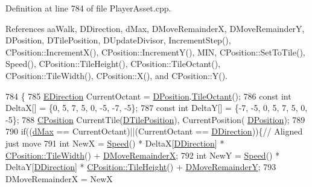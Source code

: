 Definition at line 784 of file Player\+Asset.\+cpp.



References aa\+Walk, D\+Direction, d\+Max, D\+Move\+RemainderX, D\+Move\+RemainderY, D\+Position, D\+Tile\+Position, D\+Update\+Divisor, Increment\+Step(), C\+Position\+::\+Increment\+X(), C\+Position\+::\+Increment\+Y(), M\+IN, C\+Position\+::\+Set\+To\+Tile(), Speed(), C\+Position\+::\+Tile\+Height(), C\+Position\+::\+Tile\+Octant(), C\+Position\+::\+Tile\+Width(), C\+Position\+::\+X(), and C\+Position\+::\+Y().


\begin{DoxyCode}
784                                                                                                            
                                      \{
785     \hyperlink{GameDataTypes_8h_acb2b033915f6659a71a38b5aa6e4eb42}{EDirection} CurrentOctant = \hyperlink{classCPlayerAsset_aa9f53c009b181c7c5647c6b03776a04c}{DPosition}.\hyperlink{classCPosition_a6acbc9445751b0a040c2971720f00088}{TileOctant}();
786     \textcolor{keyword}{const} \textcolor{keywordtype}{int} DeltaX[] = \{0, 5, 7, 5, 0, -5, -7, -5\};
787     \textcolor{keyword}{const} \textcolor{keywordtype}{int} DeltaY[] = \{-7, -5, 0, 5, 7, 5, 0, -5\};
788     \hyperlink{classCPosition}{CPosition} CurrentTile(\hyperlink{classCPlayerAsset_a5b59a9d3b7db8c7fa194b80dafb96186}{DTilePosition}), CurrentPosition(
      \hyperlink{classCPlayerAsset_aa9f53c009b181c7c5647c6b03776a04c}{DPosition});
789     
790     \textcolor{keywordflow}{if}((\hyperlink{GameDataTypes_8h_acb2b033915f6659a71a38b5aa6e4eb42af6546049275557ce0ade2ceee042a319}{dMax} == CurrentOctant)||(CurrentOctant == \hyperlink{classCPlayerAsset_a2f07e280268d0402220c583d1029d683}{DDirection}))\{\textcolor{comment}{// Aligned just move}
791         \textcolor{keywordtype}{int} NewX = \hyperlink{classCPlayerAsset_af1c093600f1567e3abf1cefc0f5350d5}{Speed}() * DeltaX[\hyperlink{classCPlayerAsset_a2f07e280268d0402220c583d1029d683}{DDirection}] * 
      \hyperlink{classCPosition_a27a7a8b9a5541da0aa8d97d785650fb8}{CPosition::TileWidth}() + \hyperlink{classCPlayerAsset_aa57d93e239e9a80c362949f260471456}{DMoveRemainderX};
792         \textcolor{keywordtype}{int} NewY = \hyperlink{classCPlayerAsset_af1c093600f1567e3abf1cefc0f5350d5}{Speed}() * DeltaY[\hyperlink{classCPlayerAsset_a2f07e280268d0402220c583d1029d683}{DDirection}] * 
      \hyperlink{classCPosition_ac4f0edd9c9632f1bdca981ef5d9b71e5}{CPosition::TileHeight}() + \hyperlink{classCPlayerAsset_a282502fea7d02e38aa40a538a9c1565e}{DMoveRemainderY};
793         DMoveRemainderX = NewX %

\end{DoxyCode}
